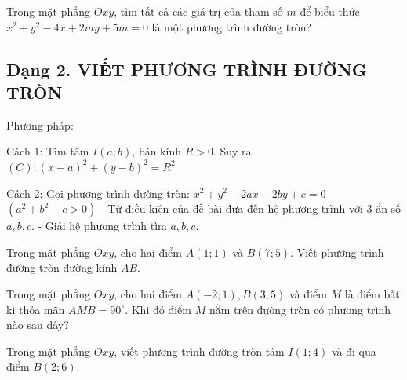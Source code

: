 \documentclass[12pt,a4paper]{book}
\begin{document}
\begin{ex}
Trong mặt phẳng $Oxy$, tìm tất cả các giá trị của tham số $ m $ để biểu thức $x^2 + y^2 - 4x + 2my + 5m = 0$ là một phương trình đường tròn?
\loigiai{}
\end{ex}

\subsection{Dạng 2. VIẾT PHƯƠNG TRÌNH ĐƯỜNG TRÒN}


Phương pháp:

Cách 1: Tìm tâm $I(a;b)$, bán kính $R > 0$. Suy ra $(C):(x-a)^2 + (y-b)^2 = R^2$

Cách 2: Gọi phương trình đường tròn: $x^2 + y^2 - 2ax - 2by + c = 0$ $(a^2 + b^2 - c > 0)$
- Từ điều kiện của đề bài đưa đến hệ phương trình với 3 ẩn số $a, b, c$.
- Giải hệ phương trình tìm $a, b, c$.

\begin{ex}
Trong mặt phẳng $Oxy$, cho hai điểm $A(1;1)$ và $B(7;5)$. Viết phương trình đường tròn đường kính $AB$.
\end{ex}

\begin{ex}
Trong mặt phẳng $Oxy$, cho hai điểm $A(-2;1), B(3;5)$ và điểm $M$ là điểm bất kì thỏa mãn $AMB = 90^\circ$. Khi đó điểm $M$ nằm trên đường tròn có phương trình nào sau đây?
\end{ex}

\begin{ex}
Trong mặt phẳng $Oxy$, viết phương trình đường tròn tâm $I(1; 4)$ và đi qua điểm $B(2; 6)$.
\end{ex}
\end{document}
